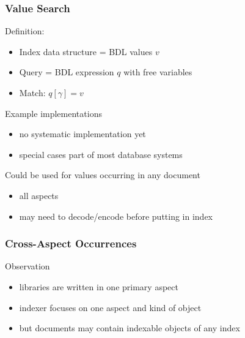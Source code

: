 \begin{frame}\frametitle{Value Search}
Definition:
\begin{itemize}
\item Index data structure = BDL values $v$
\item Query = BDL expression $q$ with free variables
\item Match: $q[\gamma]=v$
\end{itemize}

Example implementations
 \begin{itemize}
 \item no systematic implementation yet
 \item special cases part of most database systems
 \end{itemize}

Could be used for values occurring in any document
\begin{itemize}
 \item all aspects
 \item may need to decode/encode before putting in index
\end{itemize}
\end{frame}

\begin{frame}\frametitle{Cross-Aspect Occurrences}
Observation
\begin{itemize}
\item libraries are written in one primary aspect
\item indexer focuses on one aspect and kind of object
\item but documents may contain indexable objects of any index
\end{itemize}
\end{frame}

